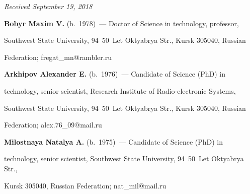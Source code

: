 







\vspace*{-3pt}





\hfill{\small\textit{Received September 19, 2018}} 





\Contr





\noindent


\textbf{Bobyr Maxim V.} (b.\ 1978)~--- Doctor of Science in technology, professor, 


Southwest State University, 94~50~Let Oktyabrya Str., Kursk 305040, Russian 


Federation; \mbox{fregat\_mn@rambler.ru}





\vspace*{3pt}





\noindent


\textbf{Arkhipov Alexander E.} (b.\ 1976)~--- Candidate of Science (PhD) in 


technology, senior scientist, Research Institute of Radio-electronic Systems, 


Southwest State University, 94~50~Let Oktyabrya Str., Kursk 305040, Russian 


Federation; \mbox{alex.76\_09@mail.ru} 





\vspace*{3pt}





\noindent


\textbf{Milostnaya Natalya A.} (b.\ 1975)~--- Candidate of Science (PhD) in 


technology, senior scientist, Southwest State University, 94~50~Let Oktyabrya Str., 


Kursk 305040, Russian Federation; \mbox{nat\_mil@mail.ru}





\label{end\stat}








\renewcommand{\bibname}{\protect\rm Литература}



